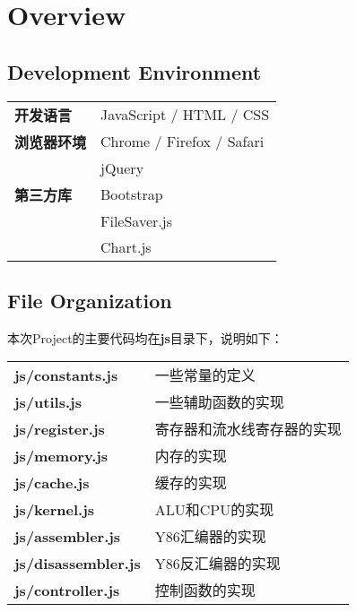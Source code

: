 
\section{Overview}

\subsection{Development Environment}

\begin{table}[h]
\begin{tabular}{ll}
{\bf 开发语言}  & JavaScript / HTML / CSS   \\
{\bf 浏览器环境} & Chrome / Firefox / Safari \\
 & jQuery                    \\
{\bf 第三方库} & Bootstrap                 \\
 & FileSaver.js              \\
 & Chart.js                 
\end{tabular}
\end{table}

\subsection{File Organization}

\noindent
本次Project的主要代码均在{\bf js}目录下，说明如下：

\begin{table}[h]
\begin{tabular}{ll}
{\bf js/constants.js}    & 一些常量的定义       \\
{\bf js/utils.js}        & 一些辅助函数的实现     \\
{\bf js/register.js}     & 寄存器和流水线寄存器的实现 \\
{\bf js/memory.js}       & 内存的实现         \\
{\bf js/cache.js}        & 缓存的实现         \\
{\bf js/kernel.js}       & ALU和CPU的实现    \\
{\bf js/assembler.js}    & Y86汇编器的实现     \\
{\bf js/disassembler.js} & Y86反汇编器的实现    \\
{\bf js/controller.js}   & 控制函数的实现      
\end{tabular}
\end{table}
